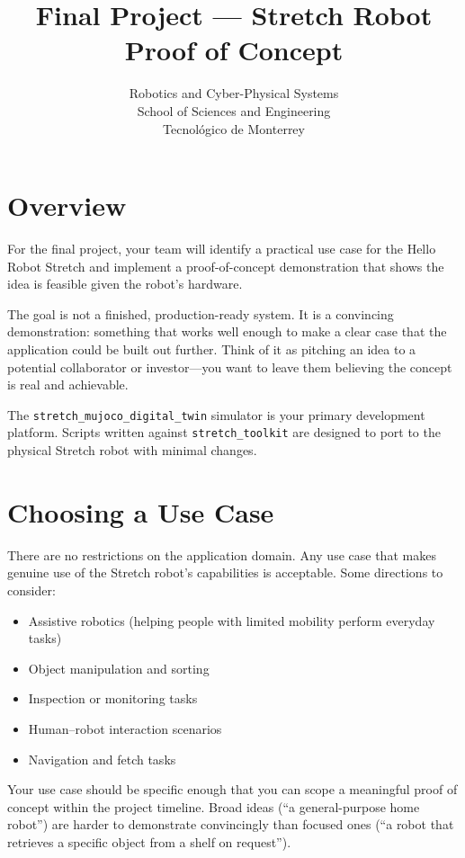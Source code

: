 \documentclass[11pt,a4paper]{article}
\title{\textbf{Final Project --- Stretch Robot Proof of Concept}}
\author{
    Robotics and Cyber-Physical Systems \\
    School of Sciences and Engineering \\
    Tecnol\'ogico de Monterrey
}
\date{}
\begin{document}
\maketitle

\section*{Overview}

For the final project, your team will identify a practical use case for the Hello Robot Stretch and implement a proof-of-concept demonstration that shows the idea is feasible given the robot's hardware.

The goal is not a finished, production-ready system. It is a convincing demonstration: something that works well enough to make a clear case that the application could be built out further. Think of it as pitching an idea to a potential collaborator or investor---you want to leave them believing the concept is real and achievable.

The \texttt{stretch\_mujoco\_digital\_twin} simulator is your primary development platform. Scripts written against \texttt{stretch\_toolkit} are designed to port to the physical Stretch robot with minimal changes.

\section*{Choosing a Use Case}

There are no restrictions on the application domain. Any use case that makes genuine use of the Stretch robot's capabilities is acceptable. Some directions to consider:

\begin{itemize}
    \item Assistive robotics (helping people with limited mobility perform everyday tasks)
    \item Object manipulation and sorting
    \item Inspection or monitoring tasks
    \item Human--robot interaction scenarios
    \item Navigation and fetch tasks
\end{itemize}

Your use case should be specific enough that you can scope a meaningful proof of concept within the project timeline. Broad ideas (``a general-purpose home robot'') are harder to demonstrate convincingly than focused ones (``a robot that retrieves a specific object from a shelf on request'').
\end{document}
